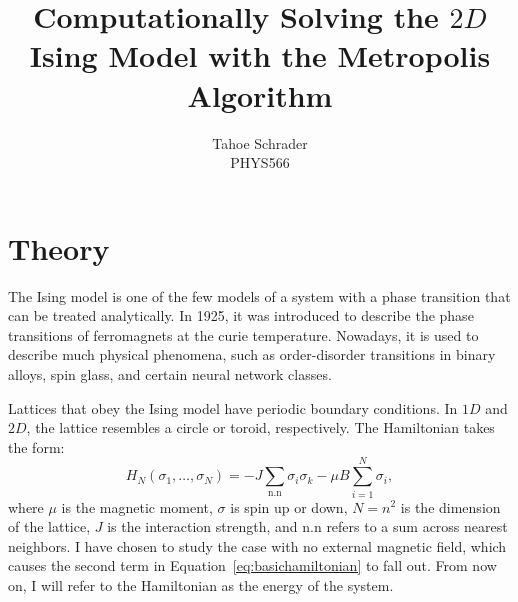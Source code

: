 \documentclass[12pt]{article}
\title{Computationally Solving the $2D$ Ising Model with the Metropolis Algorithm}
\author{Tahoe Schrader\\PHYS566}
\date{}
\begin{document}
\maketitle



\section{Theory}
\label{sec:theory}
The Ising model is one of the few models of a system with a phase transition that can be treated analytically. In 1925, it was introduced to describe the phase transitions of ferromagnets at the curie temperature. Nowadays, it is used to describe much physical phenomena, such as order-disorder transitions in binary alloys, spin glass, and certain neural network classes.

Lattices that obey the Ising model have periodic boundary conditions. In $1D$ and $2D$, the lattice resembles a circle or toroid, respectively. The Hamiltonian takes the form:
\begin{equation}
  \label{eq:basichamiltonian}
  H_N(\sigma_1,\ldots,\sigma_N) = -J \sum_{\text{n.n}} \sigma_i\sigma_k - \mu B\sum_{i=1}^N\sigma_i,
\end{equation}
where $\mu$ is the magnetic moment, $\sigma$ is spin up or down, $N=n^2$ is the dimension of the lattice, $J$ is the interaction strength, and $\text{n.n}$ refers to a sum across nearest neighbors. I have chosen to study the case with no external magnetic field, which causes the second term in Equation~\ref{eq:basichamiltonian} to fall out. From now on, I will refer to the Hamiltonian as the energy of the system.
\end{document}
